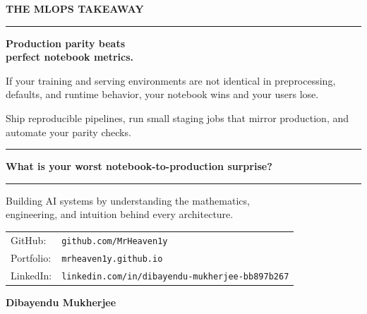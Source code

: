 \documentclass[11pt]{article}
\begin{document}
\begin{center}

{\fontsize{14}{16}\selectfont\color{brandblue}\textbf{THE MLOPS TAKEAWAY}}

\vspace{0.3in}

\begin{minipage}{0.88\textwidth}
\centering

{\color{brandblue}\rule{6cm}{1pt}}

\vspace{0.2in}

{\fontsize{24}{28}\selectfont\bfseries\color{brandnavy}
Production parity beats\\
perfect notebook metrics.
}

\vspace{0.15in}

{\fontsize{12}{14}\selectfont\color{brandgray}
If your training and serving environments are not identical in preprocessing, defaults, and runtime behavior, your notebook wins and your users lose. 

\vspace{0.1in}
Ship reproducible pipelines, run small staging jobs that mirror production, and automate your parity checks.
}

\vspace{0.2in}

{\color{brandblue}\rule{6cm}{1pt}}

\vspace{0.3in}

{\fontsize{14}{16}\selectfont\bfseries\color{brandnavy}
What is your worst notebook-to-production surprise?
}

\end{minipage}

\end{center}

\vfill

\begin{center}

\rule{0.6\textwidth}{0.5pt}

\vspace{0.12in}

{\fontsize{11}{13}\selectfont\color{brandgray}
Building AI systems by understanding the mathematics,\\
engineering, and intuition behind every architecture.
}

\vspace{0.12in}

{\fontsize{10}{12}\selectfont\color{brandgray}
\begin{tabular}{@{}l l}
GitHub: & \texttt{github.com/MrHeaven1y} \\
Portfolio: & \texttt{mrheaven1y.github.io} \\
LinkedIn: & \texttt{linkedin.com/in/dibayendu-mukherjee-bb897b267}
\end{tabular}
}

\vspace{0.12in}

{\fontsize{14}{16}\selectfont\color{brandnavy}\textbf{Dibayendu Mukherjee}}

\end{center}
\end{document}

